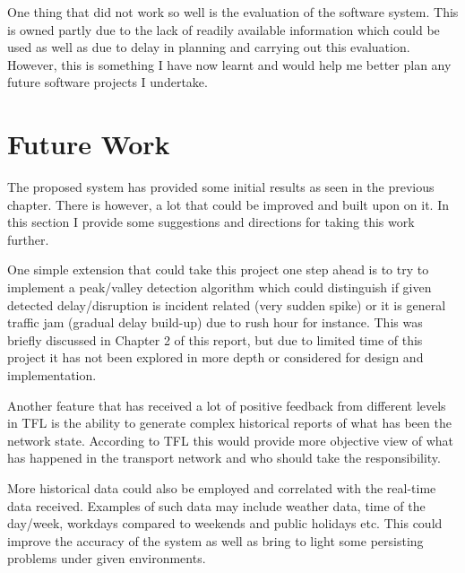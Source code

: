 One thing that did not work so well is the evaluation of the software system. This is owned partly due to the lack of readily available information which could be used as well as due to delay in planning and carrying out this evaluation. However, this is something I have now learnt and would help me better plan any future software projects I undertake.


\section{Future Work}
The proposed system has provided some initial results as seen in the previous chapter. There is however, a lot that could be improved and built upon on it. In this section I provide some suggestions and directions for taking this work further.

One simple extension that could take this project one step ahead is to try to implement a peak/valley detection algorithm which could distinguish if given detected delay/disruption is incident related (very sudden spike) or it is general traffic jam (gradual delay build-up) due to rush hour for instance. This was briefly discussed in Chapter 2 of this report, but due to limited time of this project it has not been explored in more depth or considered for design and implementation.

Another feature that has received a lot of positive feedback from different levels in TFL is the ability to generate complex historical reports of what has been the network state. According to TFL this would provide more objective view of what has happened in the transport network and who should take the responsibility. 

More historical data could also be employed and correlated with the real-time data received. Examples of such data may include weather data, time of the day/week, workdays compared to weekends and public holidays etc. This could improve the accuracy of the system as well as bring to light some persisting problems under given environments.

